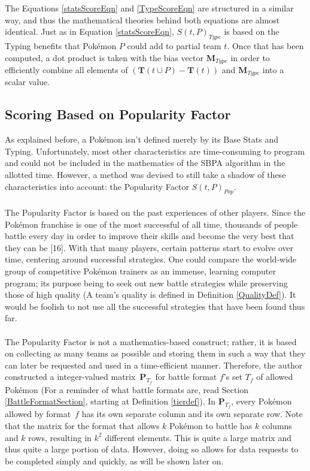 \documentclass{article}
\begin{document}
The Equations \ref{statsScoreEqn} and \ref{TypeScoreEqn} are structured in a similar way, and thus the mathematical theories behind both equations are almost identical. Just as in Equation \ref{statsScoreEqn}, $S(t,P)_{Type}$ is based on the Typing benefits that Pok\'emon $P$ could add to partial team $t$. Once that has been computed, a dot product is taken with the bias vector $\textbf{M}_{Type}$ in order to efficiently combine all elements of $(\textbf{T}(t\cup P)-\textbf{T}(t))$ and $\textbf{M}_{Type}$ into a scalar value.

\subsection{Scoring Based on Popularity Factor}
As explained before, a Pok\'emon isn't defined merely by its Base Stats and Typing. Unfortunately, most other characteristics are time-consuming to program and could not be included in the mathematics of the SBPA algorithm in the allotted time. However, a method was devised to still take a shadow of these characteristics into account: the Popularity Factor $S(t,P)_{Pop}$.\\\\
The Popularity Factor is based on the past experiences of other players. Since the Pok\'emon franchise is one of the most successful of all time, thousands of people battle every day in order to improve their skills and become the very best that they can be [16]. With that many players, certain patterns start to evolve over time, centering around successful strategies. One could compare the world-wide group of competitive Pok\'emon trainers as an immense, learning computer program; its purpose being to seek out new battle strategies while preserving those of high quality (A team's quality is defined in Definition \ref{QualityDef}). It would be foolish to not use all the successful strategies that have been found thus far.\\\\
The Popularity Factor is not a mathematics-based construct; rather, it is based on collecting as many teams as possible and storing them in such a way that they can later be requested and used in a time-efficient manner. Therefore, the author constructed a integer-valued matrix~$\textbf{P}_{T_f}$ for battle format $f$'s set $T_f$ of allowed Pok\'emon (For a reminder of what battle formats are, read Section \ref{BattleFormatSection}, starting at Definition \ref{tierdef}). In $\textbf{P}_{T_f}$, every Pok\'emon allowed by format~$f$ has its own separate column and its own separate row. Note that the matrix for the format that allows $k$ Pok\'emon to battle has $k$ columns and $k$ rows, resulting in $k^2$ different elements. This is quite a large matrix and thus quite a large portion of data. However, doing so allows for data requests to be completed simply and quickly, as will be shown later on.\\\\
\end{document}

